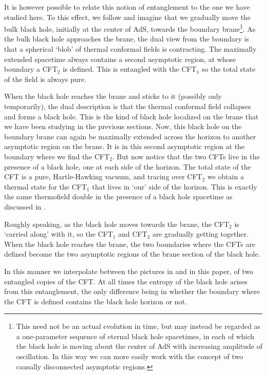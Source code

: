 \documentclass[12pt]{article}
\begin{document}
It is however possible to relate this notion of entanglement to the one
we have studied here. To this effect, we follow \cite{hms} and imagine
that we gradually move the bulk black hole, initially at the center of
AdS, towards the boundary brane\footnote{This need not be an actual
evolution in time, but may instead be regarded as a one-parameter
sequence of eternal black hole spacetimes, in each of which the black
hole is moving about the center of AdS with increasing amplitude of
oscillation. In this way we can more easily work with the concept of two
causally disconnected asymptotic regions.}. As the bulk black hole
approaches the brane, the dual view from the boundary is that a
spherical `blob' of thermal conformal fields is contracting. The
maximally extended spacetime always contains a second asymptotic region, at
whose boundary a CFT$_2$ is defined. This is entangled with the CFT$_1$
so the total state of the field is always pure. 

When the black hole reaches the brane and sticks to it (possibly only
temporarily), the dual description is that the thermal conformal field
collapses and forms a black hole. This is the kind of black hole
localized on the brane that we have been studying in the previous
sections. Now, this black hole on the boundary brane can again be
maximally extended across the horizon to another asymptotic region on
the brane. It is in this second asymptotic region at the boundary where
we find the CFT$_2$. But now notice that the two CFTs live in the
presence of a black hole, one at each side of the horizon. The total
state of the CFT is a pure, Hartle-Hawking vacuum, and tracing over
CFT$_2$ we obtain a thermal state for the CFT$_1$ that lives in `our'
side of the horizon. This is exactly the same thermofield double in the
presence of a black hole spacetime as discussed in \cite{israel}.

Roughly speaking, as the black hole moves towards the brane, the CFT$_2$
is `carried along' with it, so the CFT$_1$ and CFT$_2$ are gradually
getting together. When the black hole reaches the brane, the two
boundaries where the CFTs are defined become the two asymptotic regions
of the brane section of the black hole.

In this manner we interpolate between the pictures in \cite{malda} and
in this paper, of two entangled copies of the CFT. At all times the
entropy of the black hole arises from this entanglement, the only
difference being in whether the boundary where the CFT is defined
contains the black hole horizon or not.
\end{document}

